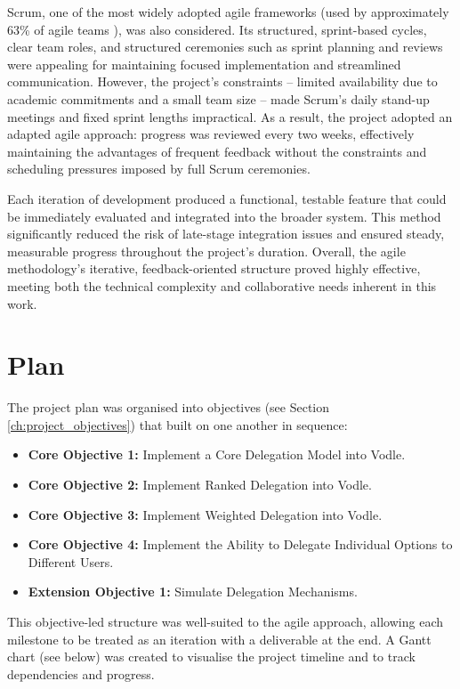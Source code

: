 Scrum, one of the most widely adopted agile frameworks (used by approximately 63\% of agile teams \citep{versionone2020stateofagile}), was also considered. Its structured, sprint-based cycles, clear team roles, and structured ceremonies such as sprint planning and reviews were appealing for maintaining focused implementation and streamlined communication. However, the project's constraints -- limited availability due to academic commitments and a small team size -- made Scrum's daily stand-up meetings and fixed sprint lengths impractical. As a result, the project adopted an adapted agile approach: progress was reviewed every two weeks, effectively maintaining the advantages of frequent feedback without the constraints and scheduling pressures imposed by full Scrum ceremonies.

Each iteration of development produced a functional, testable feature that could be immediately evaluated and integrated into the broader system. This method significantly reduced the risk of late-stage integration issues and ensured steady, measurable progress throughout the project's duration. Overall, the agile methodology's iterative, feedback-oriented structure proved highly effective, meeting both the technical complexity and collaborative needs inherent in this work.
\section{Plan}

The project plan was organised into objectives (see Section \ref{ch:project_objectives}) that built on one another in sequence:

\begin{itemize}
    \item \textbf{Core Objective 1:} Implement a Core Delegation Model into Vodle.
    \item \textbf{Core Objective 2:} Implement Ranked Delegation into Vodle.
    \item \textbf{Core Objective 3:} Implement Weighted Delegation into Vodle.
    \item \textbf{Core Objective 4:} Implement the Ability to Delegate Individual Options to Different Users.
    \item \textbf{Extension Objective 1:} Simulate Delegation Mechanisms.
\end{itemize}

This objective-led structure was well-suited to the agile approach, allowing each milestone to be treated as an iteration with a deliverable at the end. A Gantt chart (see below) was created to visualise the project timeline and to track dependencies and progress.

